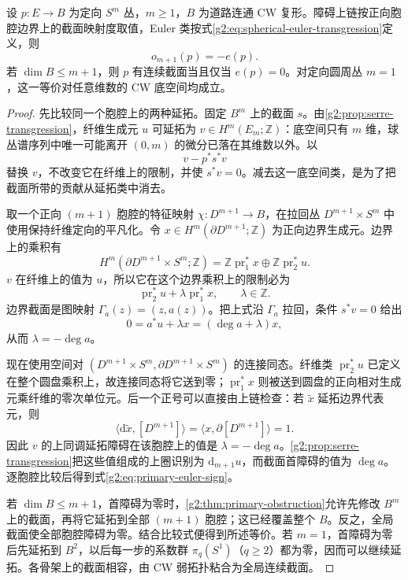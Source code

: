 \begin{theorem}\label{g2:thm:sphere-primary-euler}
	设 \(p:E\rightarrow B\) 为定向 \(S^m\) 丛，\(m\ge1\)，\(B\) 为道路连通 CW 复形。障碍上链按正向胞腔边界上的截面映射度取值，Euler 类按式\eqref{g2:eq:spherical-euler-transgression}定义，则
	\begin{equation}\label{g2:eq:primary-euler-sign}
		o_{m+1}(p)=-e(p).
	\end{equation}
	若 \(\dim B\le m+1\)，则 \(p\) 有连续截面当且仅当 \(e(p)=0\)。对定向圆周丛 \(m=1\)，这一等价对任意维数的 CW 底空间均成立。
\end{theorem}
\begin{proof}
	先比较同一个胞腔上的两种延拓。固定 \(B^m\) 上的截面 \(s\)。由\cref{g2:prop:serre-transgression}，纤维生成元 \(u\) 可延拓为 \(v\in H^m(E_m;\mathbb Z)\)：底空间只有 \(m\) 维，球丛谱序列中唯一可能离开 \((0,m)\) 的微分已落在其维数以外。以
	\[
		v-p^*s^*v
	\]
	替换 \(v\)，不改变它在纤维上的限制，并使 \(s^*v=0\)。减去这一底空间类，是为了把截面所带的贡献从延拓类中消去。

	取一个正向 \((m+1)\) 胞腔的特征映射 \(\chi:D^{m+1}\rightarrow B\)，在拉回丛 \(D^{m+1}\times S^m\) 中使用保持纤维定向的平凡化。令 \(x\in H^m(\partial D^{m+1};\mathbb Z)\) 为正向边界生成元。边界上的乘积有
	\[
		H^m(\partial D^{m+1}\times S^m;\mathbb Z)=\mathbb Z\operatorname{pr}_1^*x\oplus\mathbb Z\operatorname{pr}_2^*u.
	\]
	\(v\) 在纤维上的值为 \(u\)，所以它在这个边界乘积上的限制必为
	\[
		\operatorname{pr}_2^*u+\lambda\operatorname{pr}_1^*x,\qquad \lambda\in\mathbb Z.
	\]
	边界截面是图映射 \(\Gamma_a(z)=(z,a(z))\)。把上式沿 \(\Gamma_a\) 拉回，条件 \(s^*v=0\) 给出
	\[
		0=a^*u+\lambda x=(\deg a+\lambda)x,
	\]
	从而 \(\lambda=-\deg a\)。

	现在使用空间对 \((D^{m+1}\times S^m,\partial D^{m+1}\times S^m)\) 的连接同态。纤维类 \(\operatorname{pr}_2^*u\) 已定义在整个圆盘乘积上，故连接同态将它送到零；\(\operatorname{pr}_1^*x\) 则被送到圆盘的正向相对生成元乘纤维的零次单位元。后一个正号可以直接由上链检查：若 \(\widetilde x\) 延拓边界代表元，则
	\[
		\langle\mathrm d\widetilde x,[D^{m+1}]\rangle=\langle x,\partial[D^{m+1}]\rangle=1.
	\]
	因此 \(v\) 的上同调延拓障碍在该胞腔上的值是 \(\lambda=-\deg a\)。\cref{g2:prop:serre-transgression}把这些值组成的上圈识别为 \(\mathrm d_{m+1}u\)，而截面首障碍的值为 \(\deg a\)。逐胞腔比较后得到式\eqref{g2:eq:primary-euler-sign}。

	若 \(\dim B\le m+1\)，首障碍为零时，\cref{g2:thm:primary-obstruction}允许先修改 \(B^m\) 上的截面，再将它延拓到全部 \((m+1)\) 胞腔；这已经覆盖整个 \(B\)。反之，全局截面使全部胞腔障碍为零。结合比较式便得到所述等价。若 \(m=1\)，首障碍为零后先延拓到 \(B^2\)，以后每一步的系数群 \(\pi_q(S^1)\)（\(q\ge2\)）都为零，因而可以继续延拓。各骨架上的截面相容，由 CW 弱拓扑粘合为全局连续截面。
\end{proof}

